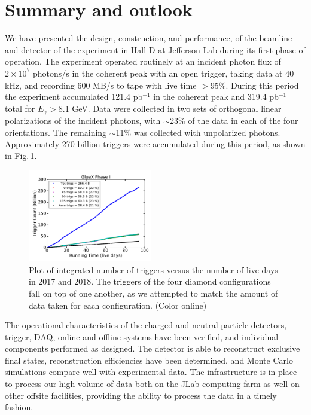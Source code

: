 
\section{Summary and outlook\label{sec:summary} }
We have presented the design, construction, and performance, of the beamline and detector of the \gx{} experiment in Hall D at Jefferson Lab during its first phase of operation. The experiment operated routinely at an incident photon flux of $2\times 10^{7}$ photons/s in the coherent peak with an open trigger, taking data at 40 kHz, and recording 600 MB/s to tape with live time $>$95\%. During this period the experiment accumulated  121.4 pb$^{-1}$ in the coherent peak and 319.4 pb$^{-1}$ total for $E_\gamma>$8.1 GeV. Data were collected in two sets of orthogonal linear polarizations of the incident photons, with $\sim$23\% of the data in each of the four orientations. The remaining $\sim$11\% was collected with unpolarized photons. Approximately 270 billion triggers were accumulated during this period, as shown in Fig.\,\ref{fig:plot_rcdb3_phaseI}.  

\begin{figure}[tbh]\centering
\includegraphics[width=0.48\textwidth]{figures/plot_rcdb3_phaseI.pdf}
\caption{\label{fig:plot_rcdb3_phaseI} 
Plot of integrated number of triggers versus the number of live days in 2017 and 2018. The triggers of the four diamond configurations fall on top of one another, as we attempted to match the amount of data taken for each configuration. 
(Color online)    
 }   
\end{figure}   

The operational characteristics of the charged and neutral particle detectors, trigger, DAQ, online and offline systems have been verified, and individual components performed as designed. The detector is able to reconstruct exclusive final states, reconstruction efficiencies have been determined, and Monte Carlo simulations compare well with experimental data. The infrastructure is in place to process our high volume of data both on the JLab computing farm as well on other offsite facilities, providing the ability to process the data in a timely fashion.

